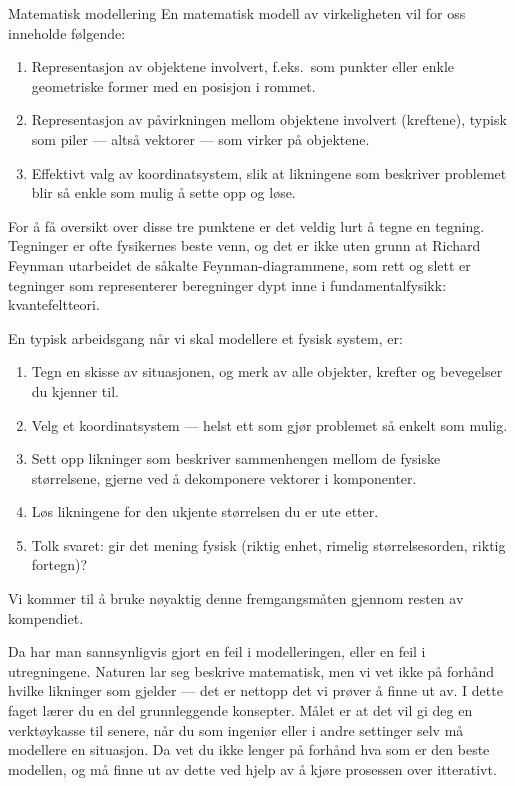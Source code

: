 \begin{myoppsum*}{Matematisk modellering}
  En matematisk modell av virkeligheten vil for oss inneholde følgende:
  \begin{enumerate}
    \item Representasjon av objektene involvert, f.eks.\ som punkter eller enkle geometriske former med en posisjon i rommet.
    \item Representasjon av påvirkningen mellom objektene involvert (kreftene), typisk som piler --- altså vektorer --- som virker på objektene.
    \item Effektivt valg av koordinatsystem, slik at likningene som beskriver problemet blir så enkle som mulig å sette opp og løse.
  \end{enumerate}
\end{myoppsum*}

For å få oversikt over disse tre punktene er det veldig lurt å tegne en tegning. Tegninger er ofte fysikernes beste venn, og det er ikke uten grunn at Richard Feynman utarbeidet de såkalte Feynman-diagrammene, som rett og slett er tegninger som representerer beregninger dypt inne i fundamentalfysikk: kvantefeltteori.

En typisk arbeidsgang når vi skal modellere et fysisk system, er:
\begin{enumerate}
  \item Tegn en skisse av situasjonen, og merk av alle objekter, krefter og bevegelser du kjenner til.
  \item Velg et koordinatsystem --- helst ett som gjør problemet så enkelt som mulig.
  \item Sett opp likninger som beskriver sammenhengen mellom de fysiske størrelsene, gjerne ved å dekomponere vektorer i komponenter.
  \item Løs likningene for den ukjente størrelsen du er ute etter.
  \item Tolk svaret: gir det mening fysisk (riktig enhet, rimelig størrelsesorden, riktig fortegn)?
\end{enumerate}
Vi kommer til å bruke nøyaktig denne fremgangsmåten gjennom resten av kompendiet.


Da har man sannsynligvis gjort en feil i modelleringen, eller en feil i utregningene. Naturen lar seg beskrive matematisk, men vi vet ikke på forhånd hvilke likninger som gjelder --- det er nettopp det vi prøver å finne ut av. I dette faget lærer du en del grunnleggende konsepter. Målet er at det vil gi deg en verktøykasse til senere, når du som ingeniør eller i andre settinger selv må modellere en situasjon. Da vet du ikke lenger på forhånd hva som er den beste modellen, og må finne ut av dette ved hjelp av å kjøre prosessen over itterativt.

